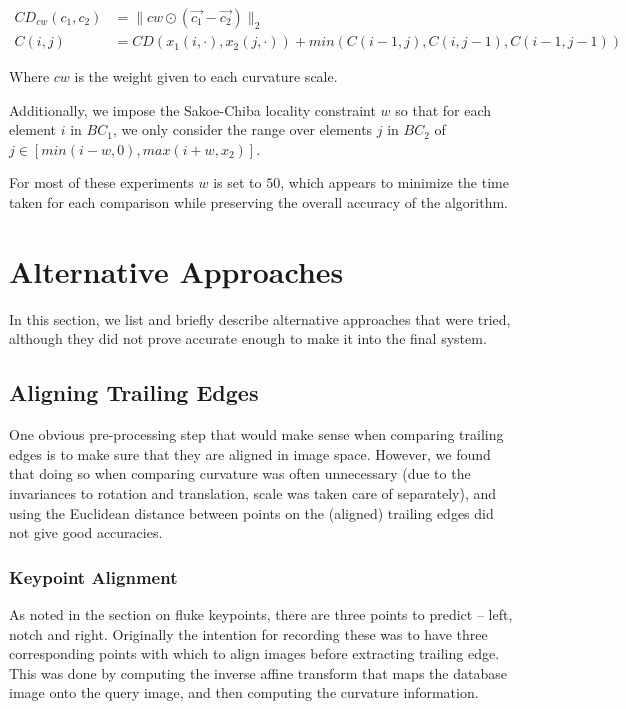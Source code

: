 \begin{align}
CD_{cw}(c_1, c_2) &= \lVert cw \odot (\vec{c_1} - \vec{c_2}) \rVert_2\\
C(i,j) &= CD(x_1(i,\cdot),x_2(j,\cdot)) + min(C(i-1,j), C(i,j-1), C(i-1, j-1))
\end{align}

Where $cw$ is the weight given to each curvature scale.

Additionally, we impose the Sakoe-Chiba \cite{sakoe1978dynamic} locality constraint $w$ so that for each element $i$ in $BC_1$, we only consider the range over elements $j$ in $BC_2$ of $j \in [min(i - w, 0), max(i + w, x_2)]$.

For most of these experiments $w$ is set to $50$, which appears to minimize the time taken for each comparison while preserving the overall accuracy of the algorithm.

\section{Alternative Approaches}

In this section, we list and briefly describe alternative approaches that were tried, although they did not prove accurate enough to make it into the final system.

\subsection{Aligning Trailing Edges}

One obvious pre-processing step that would make sense when comparing trailing edges is to make sure that they are aligned in image space.
However, we found that doing so when comparing curvature was often unnecessary (due to the invariances to rotation and translation, scale was taken care of separately), and using the Euclidean distance between points on the (aligned) trailing edges did not give good accuracies.

\subsubsection{Keypoint Alignment}

As noted in the section on fluke keypoints, there are three points to predict -- left, notch and right.
Originally the intention for recording these was to have three corresponding points with which to align images before extracting trailing edge.
This was done by computing the inverse affine transform that maps the database image onto the query image, and then computing the curvature information.

